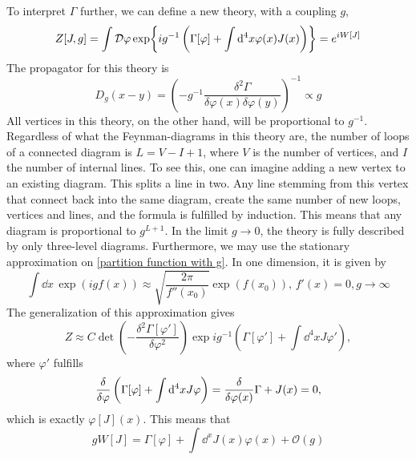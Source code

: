 To interpret $\Gamma$ further, we can define a new theory, with a coupling $g$, 
\begin{equation}
    \label{partition function with g}
    Z[J, g] = \int \mathcal{D} \varphi 
    \exp{ i g^{-1} \left( \Gamma[\varphi] + \int \dd^4x \varphi(x) J(x) \right) }
    = e^{iW[J]}
\end{equation}
The propagator for this theory is 
\begin{equation}
    D_g(x - y) 
    =
    \left(
         - g^{-1} \frac{\delta^2 \Gamma}{\delta \varphi(x) \delta \varphi(y)} 
         \right)^{-1} \propto g
\end{equation}
All vertices in this theory, on the other hand, will be proportional to $g^{-1}$.
Regardless of what the Feynman-diagrams in this theory are, the number of loops of a connected diagram is $L = V - I + 1$, where $V$ is the number of vertices, and $I$ the number of internal lines.
To see this, one can imagine adding a new vertex to an existing diagram.
This splits a line in two.
Any line stemming from this vertex that connect back into the same diagram, create the same number of new loops, vertices and lines, and the formula is fulfilled by induction.
This means that any diagram is proportional to $g^{L+1}$.
In the limit $g \rightarrow 0$, the theory is fully described by only three-level diagrams.
Furthermore, we may use the stationary approximation on \autoref{partition function with g}.
In one dimension, it is given by
\begin{equation}
    \int \dd x \, \exp(i g f(x)) 
    \approx \sqrt{\frac{2 \pi }{f''(x_0)}}\exp( f(x_0)), 
    \, f'(x) = 0, g\rightarrow \infty
\end{equation}
The generalization of this approximation gives
\begin{equation}
    Z \approx 
    C \det(- \frac{\delta^2 \Gamma[\varphi']}{\delta \varphi^2})
    \exp{i g^{-1} \left(\Gamma[\varphi'] + \int \dd^4x J \varphi'  \right)  },
\end{equation}
where $\varphi'$ fulfills
\begin{equation}
    \frac{\delta }{\delta \varphi} \left( \Gamma[\varphi] + \int \dd^4 x J \varphi \right)
    = \frac{\delta }{\delta \varphi(x)}{\Gamma} + J(x) = 0,
\end{equation}
which is exactly $\varphi[J](x)$. This means that
\begin{equation}
    g W[J] = \Gamma[\varphi] + \int \dd^x J(x) \varphi(x) + \mathcal{O}(g)
\end{equation}


